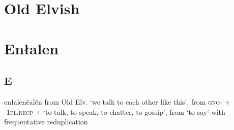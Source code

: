 
\chapter{Old Elvish}

\chapter{En\l alen}

\begin{multicols*}{2}

\section{E}

\begin{description}[leftmargin=*]
    \begin{dictentry}{enłalen}{ẽ\engma\vell alẽn}{
        from Old Elv.  `we talk to each other like this', from  \textsc{gno-} +  \textsc{-1pl.recp} +  `to talk, to speak, to chatter, to gossip', from  `to say' with frequentative reduplication
        }
    \end{dictentry}
\end{description}

\end{multicols*}